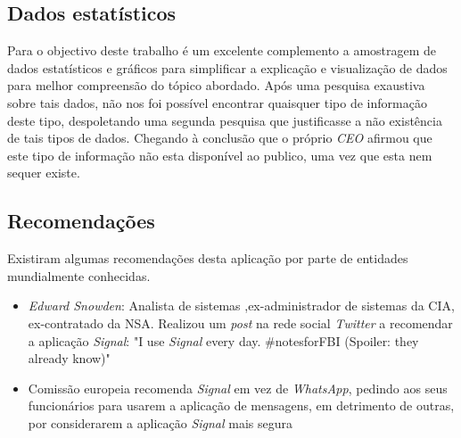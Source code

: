 \subsection{Dados estatísticos}
\label{sec:estatis}
Para o objectivo deste trabalho é um excelente complemento a amostragem de dados estatísticos e gráficos para simplificar a explicação e visualização de dados para melhor compreensão do tópico abordado.
Após uma pesquisa exaustiva sobre tais dados, não nos foi possível encontrar quaisquer tipo de informação deste tipo, despoletando uma segunda pesquisa que justificasse a não existência de tais tipos de dados. Chegando à conclusão que o próprio \textit{CEO} afirmou que este tipo de informação não esta disponível ao publico, uma vez que esta nem sequer existe.


\subsection{Recomendações}
\label{sec:recomendacoes}
Existiram algumas recomendações desta aplicação por parte de entidades mundialmente conhecidas.
\begin{itemize}
    \item \textit{Edward Snowden}: Analista de sistemas ,ex-administrador de sistemas da CIA, ex-contratado da NSA. Realizou um \textit{post} na rede social \textit{Twitter} a recomendar a aplicação \textit{Signal}: "I use \textit{Signal} every day. \#notesforFBI (Spoiler: they already know)"  \cite{Snowden_tweet}
    \item Comissão europeia recomenda \textit{Signal} em vez de \textit{WhatsApp}, pedindo aos seus funcionários para usarem a aplicação de mensagens, em detrimento de outras, por considerarem a aplicação \textit{Signal} mais segura \cite{publico_new}
\end{itemize}
